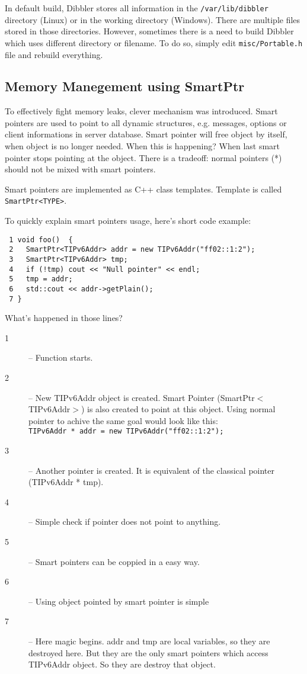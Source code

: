 In default build, Dibbler stores all information in the
\verb+/var/lib/dibbler+ directory (Linux) or in the working directory
(Windows). There are multiple files stored in those
directories. However, sometimes there is a need to build Dibbler which uses
different directory or filename. To do so, simply edit
\verb+misc/Portable.h+ file and rebuild everything.

\subsection{Memory Manegement using SmartPtr}
To effectively fight memory leaks, clever mechanism was
introduced. Smart pointers are used to point to all dynamic
structures, e.g. messages, options or client informations in server
database. Smart pointer will free object by itself, when object is no
longer needed. When this is happening? When last smart pointer stops
pointing at the object. There is a tradeoff: normal pointers (*)
should not be mixed with smart pointers. 

Smart pointers are implemented as C++ class templates. Template is
called \verb+SmartPtr<TYPE>+.

To quickly explain smart pointers usage, here's short code example:
\begin{verbatim}
 1 void foo()  {
 2   SmartPtr<TIPv6Addr> addr = new TIPv6Addr("ff02::1:2");
 3   SmartPtr<TIPv6Addr> tmp;
 4   if (!tmp) cout << "Null pointer" << endl;
 5   tmp = addr;
 6   std::cout << addr->getPlain();
 7 }
\end{verbatim}
What's happened in those lines?
\begin{description}
\item[1] -- Function starts.
\item[2] -- New TIPv6Addr object is created. Smart Pointer
  (SmartPtr$<$TIPv6Addr$>$) is also created to point at this object. Using
  normal pointer to achive the same goal would look like this: \\
  \verb+TIPv6Addr * addr = new TIPv6Addr("ff02::1:2");+
\item[3] -- Another pointer is created. It is equivalent of the
  classical pointer (TIPv6Addr * tmp).
\item[4] -- Simple check if pointer does not point to anything.
\item[5] -- Smart pointers can be coppied in a easy way.
\item[6] -- Using object pointed by smart pointer is simple
\item[7] -- Here magic begins. addr and tmp are local variables, so
  they are destroyed here. But they are the only smart pointers which
  access TIPv6Addr object. So they are destroy that object. 
\end{description}

